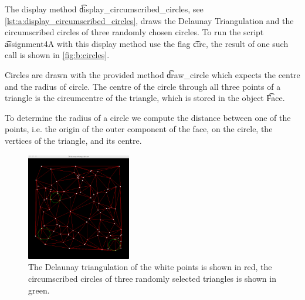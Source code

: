 The display method \t{display_circumscribed_circles}, see \autoref{lst:a:display_circumscribed_circles}, draws the Delaunay Triangulation and the circumscribed circles of three randomly chosen circles. To run the script \t{assignment4A} with this display method use the flag \t{circ}, the result of one such call is shown in \autoref{fig:b:circles}.



Circles are drawn with the provided method \t{draw_circle} which expects the centre and the radius of circle. The centre of the circle through all three points of a triangle is the circumcentre of the triangle, which is stored in the object \t{Face}.

To determine the radius of a circle we compute the distance between one of the points, i.e. the origin of the outer component of the face, on the circle, the vertices of the triangle, and its centre.

\begin{figure}
	\centering
	\includegraphics[width=0.405\textwidth]{./img/b_circles}
	\caption{The Delaunay triangulation of the white points is shown in red, the circumscribed circles of three randomly selected triangles is shown in green.}
	\label{fig:b:circles}
\end{figure}